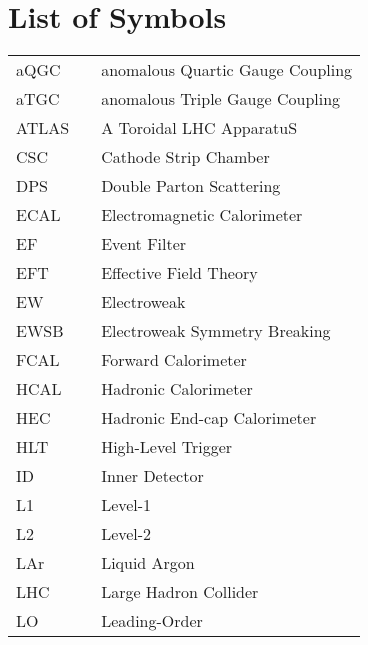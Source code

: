 \chapter*{List of Symbols}
  \begin{tabular}{lp{}p{}}
    aQGC        & \dotfill & anomalous Quartic Gauge Coupling \\
    aTGC         & \dotfill & anomalous Triple Gauge Coupling \\
    ATLAS       & \dotfill & A Toroidal LHC ApparatuS \\
    CSC         & \dotfill & Cathode Strip Chamber \\
    DPS         & \dotfill & Double Parton Scattering \\
    ECAL        & \dotfill & Electromagnetic Calorimeter \\
    EF          & \dotfill & Event Filter \\
    EFT         & \dotfill & Effective Field Theory \\
    EW          & \dotfill & Electroweak \\
    EWSB        & \dotfill & Electroweak Symmetry Breaking \\
    FCAL        & \dotfill & Forward Calorimeter \\
    HCAL        & \dotfill & Hadronic Calorimeter \\
    HEC         & \dotfill & Hadronic End-cap Calorimeter \\
    HLT         & \dotfill & High-Level Trigger \\
    ID          & \dotfill & Inner Detector \\
    L1          & \dotfill & Level-1 \\
    L2          & \dotfill & Level-2 \\
    LAr         & \dotfill & Liquid Argon \\
    LHC         & \dotfill & Large Hadron Collider \\
    LO          & \dotfill & Leading-Order \\
  \end{tabular}

